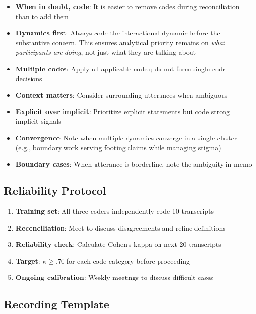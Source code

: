 \documentclass[11pt]{article}
\begin{document}
\begin{itemize}[leftmargin=*]
\item \textbf{When in doubt, code}: It is easier to remove codes during reconciliation than to add them
\item \textbf{Dynamics first}: Always code the interactional dynamic before the substantive concern. This ensures analytical priority remains on \textit{what participants are doing}, not just what they are talking about
\item \textbf{Multiple codes}: Apply all applicable codes; do not force single-code decisions
\item \textbf{Context matters}: Consider surrounding utterances when ambiguous
\item \textbf{Explicit over implicit}: Prioritize explicit statements but code strong implicit signals
\item \textbf{Convergence}: Note when multiple dynamics converge in a single cluster (e.g., boundary work serving footing claims while managing stigma)
\item \textbf{Boundary cases}: When utterance is borderline, note the ambiguity in memo
\end{itemize}

\subsection{Reliability Protocol}

\begin{enumerate}[leftmargin=*]
\item \textbf{Training set}: All three coders independently code 10 transcripts
\item \textbf{Reconciliation}: Meet to discuss disagreements and refine definitions
\item \textbf{Reliability check}: Calculate Cohen's kappa on next 20 transcripts
\item \textbf{Target}: $\kappa \geq .70$ for each code category before proceeding
\item \textbf{Ongoing calibration}: Weekly meetings to discuss difficult cases
\end{enumerate}

\subsection{Recording Template}
\end{document}
